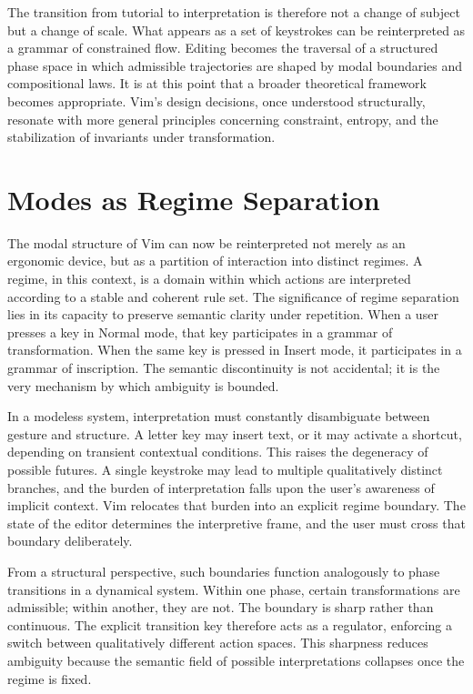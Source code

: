 \documentclass[12pt]{article}
\begin{document}
The transition from tutorial to interpretation is therefore not a change of subject but a change of scale. What appears as a set of keystrokes can be reinterpreted as a grammar of constrained flow. Editing becomes the traversal of a structured phase space in which admissible trajectories are shaped by modal boundaries and compositional laws. It is at this point that a broader theoretical framework becomes appropriate. Vim’s design decisions, once understood structurally, resonate with more general principles concerning constraint, entropy, and the stabilization of invariants under transformation.

\section{Modes as Regime Separation}

The modal structure of Vim can now be reinterpreted not merely as an ergonomic device, but as a partition of interaction into distinct regimes. A regime, in this context, is a domain within which actions are interpreted according to a stable and coherent rule set. The significance of regime separation lies in its capacity to preserve semantic clarity under repetition. When a user presses a key in Normal mode, that key participates in a grammar of transformation. When the same key is pressed in Insert mode, it participates in a grammar of inscription. The semantic discontinuity is not accidental; it is the very mechanism by which ambiguity is bounded.

In a modeless system, interpretation must constantly disambiguate between gesture and structure. A letter key may insert text, or it may activate a shortcut, depending on transient contextual conditions. This raises the degeneracy of possible futures. A single keystroke may lead to multiple qualitatively distinct branches, and the burden of interpretation falls upon the user’s awareness of implicit context. Vim relocates that burden into an explicit regime boundary. The state of the editor determines the interpretive frame, and the user must cross that boundary deliberately.

From a structural perspective, such boundaries function analogously to phase transitions in a dynamical system. Within one phase, certain transformations are admissible; within another, they are not. The boundary is sharp rather than continuous. The explicit transition key therefore acts as a regulator, enforcing a switch between qualitatively different action spaces. This sharpness reduces ambiguity because the semantic field of possible interpretations collapses once the regime is fixed.
\end{document}
